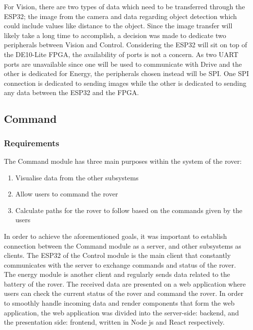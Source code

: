 \documentclass[a4paper]{article}
\begin{document}
For Vision, there are two types of data which need to be transferred 
through the ESP32; the image from the camera and data regarding object 
detection which could include values like distance to the object. Since 
the image transfer will likely take a long time to accomplish, a decision
was made to dedicate two peripherals between Vision and Control. 
Considering the ESP32 will sit on top of the DE10-Lite FPGA, the 
availability of ports is not a concern. As two UART ports are unavailable 
since one will be used to communicate with Drive and the other is 
dedicated for Energy, the peripherals chosen instead will be SPI. 
One SPI connection is dedicated to sending images while the other is 
dedicated to sending any data between the ESP32 and the FPGA.

\subsection{Command}

\subsubsection{Requirements}

The Command module has three main purposes within the system of the rover:

\begin{enumerate}
    \item Visualise data from the other subsystems
    \item Allow users to command the rover
    \item Calculate paths for the rover to follow based on the commands given by the users
\end{enumerate}

In order to achieve the aforementioned goals, it was important to establish 
connection between the Command module as a server, and other subsystems as 
clients. The ESP32 of the Control module is the main client that constantly 
communicates with the server to exchange commands and status of the rover. 
The energy module is another client and regularly sends data related to the 
battery of the rover. The received data are presented on a web application 
where users can check the current status of the rover and command the rover. 
In order to smoothly handle incoming data and render components that form the 
web application, the web application was divided into the server-side: backend, 
and the presentation side: frontend, written in Node js and React respectively.
\end{document}

